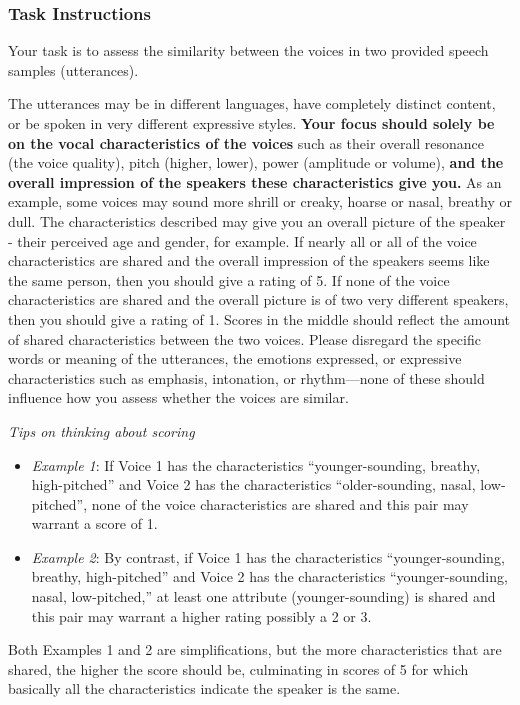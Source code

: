 \subsubsection{Task Instructions}
Your task is to assess the similarity between the voices in two provided speech samples (utterances).

The utterances may be in different languages, have completely distinct content, or be spoken in very different expressive styles. \textbf{Your focus should solely be on the vocal characteristics of the voices} such as their overall resonance (the voice quality), pitch (higher, lower), power (amplitude or volume), \textbf{and the overall impression of the speakers these characteristics give you.} As an example, some voices may sound more shrill or creaky, hoarse or nasal, breathy or dull. The characteristics described may give you an overall picture of the speaker - their perceived age and gender, for example.
If nearly all or all of the voice characteristics are shared and the overall impression of the speakers seems like the same person, then you should give a rating of 5. If none of the voice characteristics are shared and the overall picture is of two very different speakers, then you should give a rating of 1. Scores in the middle should reflect the amount of shared characteristics between the two voices.
Please disregard the specific words or meaning of the utterances, the emotions expressed, or expressive characteristics such as emphasis, intonation, or rhythm—none of these should influence how you assess whether the voices are similar.
\begin{boxA}
\textit{ Tips on thinking about scoring}
    \begin{itemize}
        \item \textit{Example 1}: If Voice 1 has the characteristics “younger-sounding, breathy, high-pitched” and Voice 2 has the characteristics “older-sounding, nasal, low-pitched”, none of the voice characteristics are shared and this pair may warrant a score of 1.
        \item \textit{Example 2}: By contrast, if Voice 1 has the characteristics “younger-sounding, breathy, high-pitched” and Voice 2 has the characteristics “younger-sounding, nasal, low-pitched,” at least one attribute (younger-sounding) is shared and this pair may warrant a higher rating possibly a 2 or 3.
    \end{itemize}
    Both Examples 1 and 2 are simplifications, but the more characteristics that are shared, the higher the score should be, culminating in scores of 5 for which basically all the characteristics indicate the speaker is the same.
\end{boxA}

